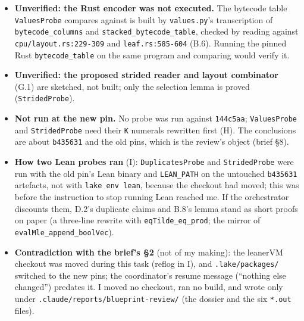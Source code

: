 \begin{itemize}
\item \textbf{Unverified: the Rust encoder was not executed.} The bytecode table \texttt{ValuesProbe} compares against is built by \texttt{values.\allowbreak{}py}'s transcription of \texttt{bytecode\_\allowbreak{}columns} and \texttt{stacked\_\allowbreak{}bytecode\_\allowbreak{}table}, checked by reading against \texttt{cpu/\allowbreak{}layout.\allowbreak{}rs:229-{}309} and \texttt{leaf.\allowbreak{}rs:585-{}604} (B.6). Running the pinned Rust \texttt{bytecode\_\allowbreak{}table} on the same program and comparing would verify it.
\item \textbf{Unverified: the proposed strided reader and layout combinator} (G.1) are sketched, not built; only the selection lemma is proved (\texttt{StridedProbe}).
\item \textbf{Not run at the new pin.} No probe was run against \texttt{144c5aa}; \texttt{ValuesProbe} and \texttt{StridedProbe} need their \texttt{K} numerals rewritten first (H). The conclusions are about \texttt{b435631} and the old pins, which is the review's object (brief §8).
\item \textbf{How two Lean probes ran} (I): \texttt{DuplicatesProbe} and \texttt{StridedProbe} were run with the old pin's Lean binary and \texttt{LEAN\_\allowbreak{}PATH} on the untouched \texttt{b435631} artefacts, not with \texttt{lake env lean}, because the checkout had moved; this was before the instruction to stop running Lean reached me. If the orchestrator discounts them, D.2's duplicate claims and B.8's lemma stand as short proofs on paper (a three-line rewrite with \texttt{eqTilde\_\allowbreak{}eq\_\allowbreak{}prod}; the mirror of \texttt{evalMle\_\allowbreak{}append\_\allowbreak{}boolVec}).
\item \textbf{Contradiction with the brief's §2} (not of my making): the leanerVM checkout was moved during this task (reflog in I), and \texttt{.\allowbreak{}lake/\allowbreak{}packages/} switched to the new pins; the coordinator's resume message (\enquote{nothing else changed}) predates it. I moved no checkout, ran no build, and wrote only under \texttt{.\allowbreak{}c\allowbreak{}l\allowbreak{}a\allowbreak{}u\allowbreak{}d\allowbreak{}e\allowbreak{}/\allowbreak{}r\allowbreak{}e\allowbreak{}p\allowbreak{}o\allowbreak{}r\allowbreak{}t\allowbreak{}s\allowbreak{}/\allowbreak{}b\allowbreak{}l\allowbreak{}u\allowbreak{}e\allowbreak{}p\allowbreak{}r\allowbreak{}i\allowbreak{}n\allowbreak{}t\allowbreak{}-{}\allowbreak{}r\allowbreak{}e\allowbreak{}v\allowbreak{}i\allowbreak{}e\allowbreak{}w\allowbreak{}/} (the dossier and the six \texttt{*.\allowbreak{}out} files).

\end{itemize}
